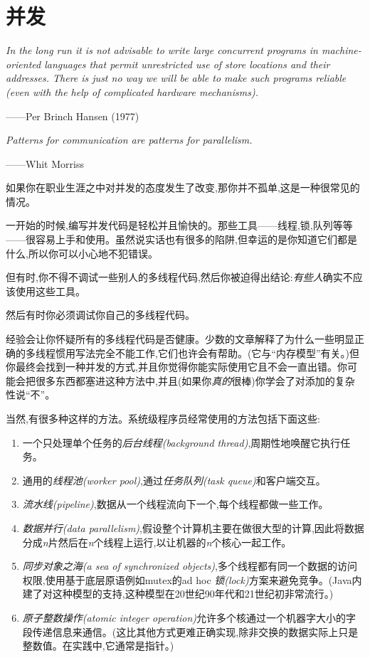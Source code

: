 \chapter{并发}\label{ch19}

\emph{In the long run it is not advisable to write large concurrent programs in machine-oriented languages that permit unrestricted use of store locations and their addresses. There is just no way we will be able to make such programs reliable (even with the help of complicated hardware mechanisms).}

\begin{flushright}
    ——Per Brinch Hansen (1977)
\end{flushright}

\emph{Patterns for communication are patterns for parallelism.}

\begin{flushright}
    ——Whit Morriss
\end{flushright}

如果你在职业生涯之中对并发的态度发生了改变,那你并不孤单,这是一种很常见的情况。

一开始的时候,编写并发代码是轻松并且愉快的。那些工具——线程,锁,队列等等——很容易上手和使用。虽然说实话也有很多的陷阱,但幸运的是你知道它们都是什么,所以你可以小心地不犯错误。

但有时,你不得不调试一些别人的多线程代码,然后你被迫得出结论:\emph{有些人}确实不应该使用这些工具。

然后有时你必须调试你自己的多线程代码。

经验会让你怀疑所有的多线程代码是否健康。少数的文章解释了为什么一些明显正确的多线程惯用写法完全不能工作,它们也许会有帮助。(它与“内存模型”有关。)但你最终会找到一种并发的方式,并且你觉得你能实际使用它且不会一直出错。你可能会把很多东西都塞进这种方法中,并且(如果你\emph{真的}很棒)你学会了对添加的复杂性说“不”。

当然,有很多种这样的方法。系统级程序员经常使用的方法包括下面这些:
\begin{enumerate}
    \item 一个只处理单个任务的\emph{后台线程(background thread)},周期性地唤醒它执行任务。
    \item 通用的\emph{线程池(worker pool)},通过\emph{任务队列(task queue)}和客户端交互。
    \item \emph{流水线(pipeline)},数据从一个线程流向下一个,每个线程都做一些工作。
    \item \emph{数据并行(data parallelism)},假设整个计算机主要在做很大型的计算,因此将数据分成\emph{n}片然后在\emph{n}个线程上运行,以让机器的\emph{n}个核心一起工作。
    \item \emph{同步对象之海(a sea of synchronized objects)},多个线程都有同一个数据的访问权限,使用基于底层原语例如mutex的ad hoc \emph{锁(lock)}方案来避免竞争。(Java内建了对这种模型的支持,这种模型在20世纪90年代和21世纪初非常流行。)
    \item \emph{原子整数操作(atomic integer operation)}允许多个核通过一个机器字大小的字段传递信息来通信。(这比其他方式更难正确实现,除非交换的数据实际上只是整数值。在实践中,它通常是指针。)
\end{enumerate}

